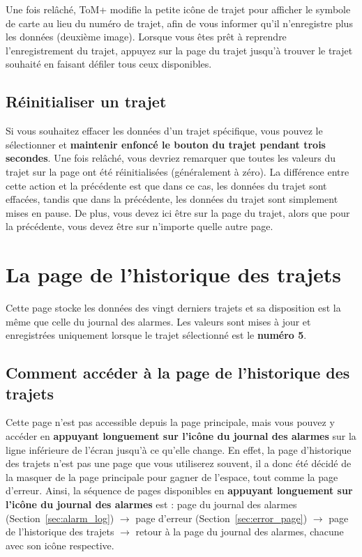 Une fois relâché, ToM+ modifie la petite icône de trajet pour afficher le symbole de carte au lieu du numéro de trajet, afin de vous informer qu'il n'enregistre plus les données (deuxième image). Lorsque vous êtes prêt à reprendre l'enregistrement du trajet, appuyez sur la page du trajet jusqu'à trouver le trajet souhaité en faisant défiler tous ceux disponibles.

\subsection{Réinitialiser un trajet}

Si vous souhaitez effacer les données d'un trajet spécifique, vous pouvez le sélectionner et \textbf{maintenir enfoncé le bouton du trajet pendant trois secondes}. Une fois relâché, vous devriez remarquer que toutes les valeurs du trajet sur la page ont été réinitialisées (généralement à zéro). La différence entre cette action et la précédente est que dans ce cas, les données du trajet sont effacées, tandis que dans la précédente, les données du trajet sont simplement mises en pause. De plus, vous devez ici être sur la page du trajet, alors que pour la précédente, vous devez être sur n'importe quelle autre page.

\clearpage

\section{La page de l'historique des trajets}
\label{sec:trip_history}

Cette page stocke les données des vingt derniers trajets et sa disposition est la même que celle du journal des alarmes. Les valeurs sont mises à jour et enregistrées uniquement lorsque le trajet sélectionné est le \textbf{numéro 5}.

\subsection{Comment accéder à la page de l'historique des trajets}

Cette page n'est pas accessible depuis la page principale, mais vous pouvez y accéder en \textbf{appuyant longuement sur l'icône du journal des alarmes} sur la ligne inférieure de l'écran jusqu'à ce qu'elle change. En effet, la page d'historique des trajets n'est pas une page que vous utiliserez souvent, il a donc été décidé de la masquer de la page principale pour gagner de l'espace, tout comme la page d'erreur. Ainsi, la séquence de pages disponibles en \textbf{appuyant longuement sur l'icône du journal des alarmes} est : page du journal des alarmes (Section~\ref{sec:alarm_log}) $\rightarrow$ page d'erreur (Section~\ref{sec:error_page}) $\rightarrow$ page de l'historique des trajets $\rightarrow$ retour à la page du journal des alarmes, chacune avec son icône respective.\\

